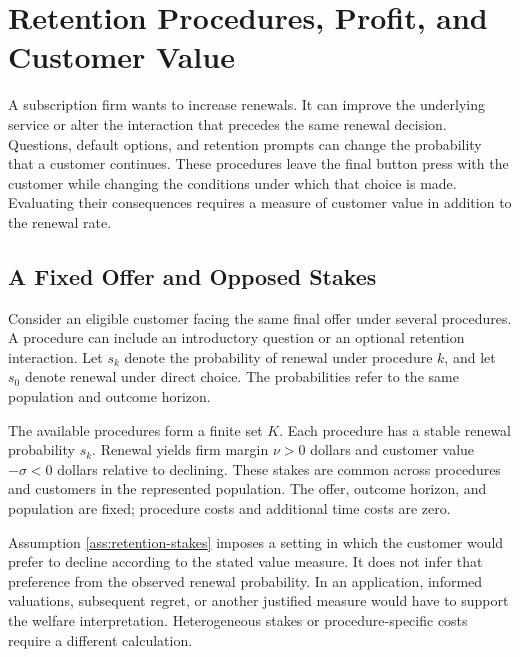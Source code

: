 \hypertarget{M08-retention-procedures-profit-and-customer-value}{%
\section{Retention Procedures, Profit, and Customer
Value}\label{M08-retention-procedures-profit-and-customer-value}}

\noindent \noindent A subscription firm wants to increase renewals. It can improve
the underlying service or alter the interaction that precedes the same
renewal decision. Questions, default options, and retention prompts can
change the probability that a customer continues. These procedures leave
the final button press with the customer while changing the conditions
under which that choice is made. Evaluating their consequences requires
a measure of customer value in addition to the renewal rate.

\hypertarget{M08-a-fixed-offer-and-opposed-stakes}{%
\subsection{A Fixed Offer and Opposed
Stakes}\label{M08-a-fixed-offer-and-opposed-stakes}}

\noindent \noindent Consider an eligible customer facing the same final offer
under several procedures. A procedure can include an introductory
question or an optional retention interaction. Let \(s_k\) denote the
probability of renewal under procedure \(k\), and let \(s_0\) denote
renewal under direct choice. The probabilities refer to the same
population and outcome horizon.

\begin{assumption}
\label{ass:retention-stakes}
The available procedures form a finite set $K$. Each procedure has a stable renewal probability $s_k$. Renewal yields firm margin $\nu>0$ dollars and customer value $-\sigma<0$ dollars relative to declining. These stakes are common across procedures and customers in the represented population. The offer, outcome horizon, and population are fixed; procedure costs and additional time costs are zero.
\end{assumption}

\noindent Assumption \ref{ass:retention-stakes} imposes a setting in
which the customer would prefer to decline according to the stated value
measure. It does not infer that preference from the observed renewal
probability. In an application, informed valuations, subsequent regret,
or another justified measure would have to support the welfare
interpretation. Heterogeneous stakes or procedure-specific costs require
a different calculation.


